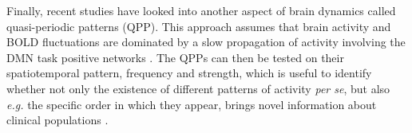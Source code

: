 Finally, recent studies have looked into another aspect of brain dynamics called quasi-periodic patterns (QPP)\citep{Majeed2011}. This approach assumes that brain activity and BOLD fluctuations are dominated by a slow propagation of activity involving the DMN task positive networks \citep{Abbas2019}. The QPPs can then be tested on their spatiotemporal pattern, frequency and strength, which is useful to identify whether not only the existence of different patterns of activity \textit{per se}, but also \textit{e.g.} the specific order in which they appear, brings novel information about clinical populations \citep{Briend2020}.



